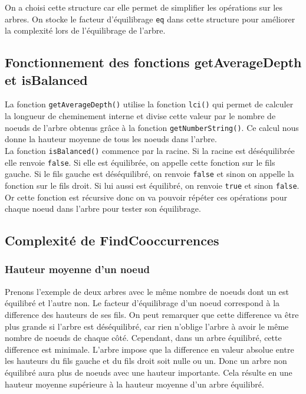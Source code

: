 \documentclass{article}
\begin{document}
    On a choisi cette structure car elle permet de simplifier les opérations
    sur les arbres. On stocke le facteur d'équilibrage \texttt{eq} dans cette
    structure pour améliorer la complexité lors de l'équilibrage de l'arbre.

    \subsection{Fonctionnement des fonctions getAverageDepth et isBalanced}
    La fonction \texttt{getAverageDepth()} utilise la fonction \texttt{lci()}
    qui permet de calculer la longueur de cheminement interne et
    divise cette valeur par le nombre de noeuds de l'arbre obtenus
    grâce à la fonction \texttt{getNumberString()}. Ce calcul nous donne la
    hauteur moyenne de tous les noeuds dans l'arbre.\\

    La fonction \texttt{isBalanced()} commence par la racine. Si la racine est
    déséquilibrée elle renvoie \texttt{false}. Si elle est équilibrée, on
    appelle cette fonction sur le fils gauche. Si le fils gauche est déséquilibré, on
    renvoie \texttt{false} et sinon on appelle la fonction sur le fils droit.
    Si lui aussi est équilibré, on renvoie \texttt{true} et sinon \texttt{false}.
    Or cette fonction est récursive donc on va pouvoir répéter ces opérations pour
    chaque noeud dans l'arbre pour tester son équilibrage.

    \subsection{Complexité de FindCooccurrences}

        \subsubsection{Hauteur moyenne d'un noeud}
        Prenons l'exemple de deux arbres avec le même nombre de noeuds dont un
        est équilibré et l'autre non.
        Le facteur d'équilibrage d'un noeud correspond à la difference des
        hauteurs de ses fils. On peut remarquer que cette difference va être plus
        grande si l'arbre est déséquilibré, car rien n'oblige l'arbre à avoir
        le même nombre de noeuds de chaque côté. Cependant, dans un arbre
        équilibré, cette difference est minimale. L'arbre impose que la difference
        en valeur absolue entre les hauteurs du fils gauche et du fils droit soit
        nulle ou un. Donc un arbre non équilibré aura plus de noeuds avec une
        hauteur importante. Cela résulte en une hauteur moyenne
        supérieure à la hauteur moyenne d'un arbre équilibré.\\
\end{document}
